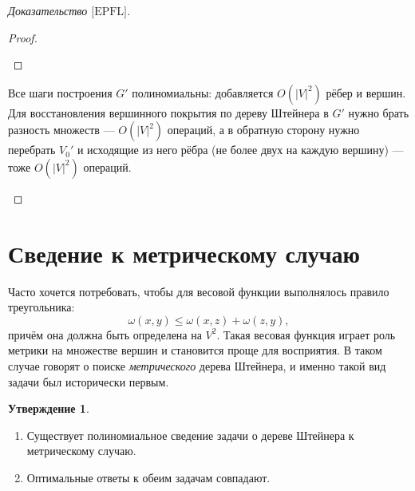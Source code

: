 \documentclass[11pt,a4paper]{report}
\def\le{\leqslant}
\theoremstyle{definition}
\theoremstyle{definition}
\newtheorem{preposition}{Утверждение}[section]
\theoremstyle{definition}
\begin{document}
\begin{proof}[Доказательство $ \text{[EPFL]} $]
\begin{enumerate}
\begin{proof}
\begin{itemize}
				\end{itemize} 
			\end{proof}
			Все шаги построения $G'$ полиномиальны: добавляется $O(|V|^2)$ рёбер и вершин. Для восстановления вершинного покрытия по дереву Штейнера в $G'$ нужно брать разность множеств — $O(|V|^2)$ операций, а в обратную сторону нужно перебрать $V_0'$ и исходящие из него рёбра (не более двух на каждую вершину) — тоже $O(|V|^2)$ операций.
		\end{enumerate}
	\end{proof}
	\section{Сведение к метрическому случаю}
		Часто хочется потребовать, чтобы для весовой функции выполнялось правило треугольника:
		$$
			\omega(x, y) \le \omega(x, z) + \omega(z, y),		
		$$
		причём она должна быть определена на $V^2$. Такая весовая функция играет роль метрики на множестве вершин и становится проще для восприятия. В таком случае говорят о поиске \textit{метрического} дерева Штейнера, и именно такой вид задачи был исторически первым.
		\begin{preposition}$  $
			\begin{enumerate}
				\item Существует полиномиальное сведение задачи о дереве Штейнера к метрическому случаю.
				\item Оптимальные ответы к обеим задачам совпадают.
			\end{enumerate}
		\end{preposition}
\end{document}
